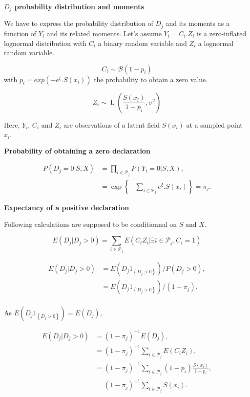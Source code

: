\documentclass[
  english,
  man,floatsintext]{apa6}
\begin{document}
\textbf{\(D_j\) probability distribution and moments}

We have to express the probability distribution of \(D_j\) and its moments as a function of \(Y_{i}\) and its related moments. Let's assume \(Y_{i} = C_{i}.Z_{i}\) is a zero-inflated lognormal distribution with \(C_{i}\) a binary random variable and \(Z_{i}\) a lognormal random variable.

\[C_{i} \sim \mathcal{B}(1-p_{i})\]
with \(p_{i}=exp(-e^\xi .S(x_{i}))\) the probability to obtain a zero value.

\[Z_{i} \sim \operatorname{L}(\frac{S(x_{i})}{1-p_{i}},\sigma^2)\]

Here, \(Y_{i}\), \(C_{i}\) and \(Z_{i}\) are observations of a latent field \(S(x_{i})\) at a sampled point \(x_{i}\).

\textbf{Probability of obtaining a zero declaration}

\begin{align*}
P(D_j = 0 \vert S, X) & = \prod_{i\in \mathcal{P}_j} P(Y_{i} = 0 \vert S, X),\nonumber \\
                      & = \exp{ \left \lbrace- \sum_{i\in \mathcal{P}_j} e^{\xi}. S(x_{i})\right \rbrace} = \pi_j.
\end{align*}

\textbf{Expectancy of a positive declaration}

Following calculations are supposed to be conditionnal on \(S\) and \(X\).

\[E(D_j\vert D_j >0) =  \sum_{i\in \mathcal{P}_j} E(C_{i} Z_{i}\vert \exists i\in\mathcal{P}_j , C_{i}=1)\]

\begin{align*}
E(D_j\vert D_j > 0) & = E(D_j 1_{ \left \lbrace D_j > 0\right\rbrace } )  / P\left ( D_j > 0\right ),   \\
& = E(D_j 1_{ \left \lbrace D_j > 0\right\rbrace } )  / \left (1-\pi_j\right).   \\
\end{align*}

As \(E(D_j 1_{ \left \lbrace D_j > 0\right\rbrace } ) = E(D_j ),\)

\begin{align*}
E(D_j\vert D_j > 0) & = \left (1- \pi_j\right)^{-1} E(D_j)   ,   \nonumber \\
& = \left (1- \pi_j\right)^{-1} \sum_{i\in \mathcal{P}_j} E(C_{i} Z_{i}),\nonumber \\
& = \left (1- \pi_j\right)^{-1} \sum_{i\in \mathcal{P}_j} (1-p_{i}) \frac{S(x_{i})}{1-p_{i}}, \nonumber \\
& = \left (1- \pi_j\right)^{-1}\sum_{i\in \mathcal{P}_j} S(x_{i}).
\end{align*}
\end{document}
